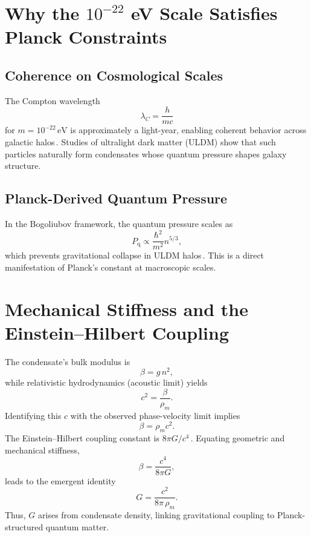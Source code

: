 \documentclass[aps,prd,twocolumn,amsmath,amssymb,longbibliography,nofootinbib]{revtex4-2}
\begin{document}
\section{Why the \texorpdfstring{$10^{-22}$}{1e-22} eV Scale Satisfies Planck Constraints}
\subsection{Coherence on Cosmological Scales}
The Compton wavelength
\begin{equation}
  \lambda_C = \frac{h}{m c}
\end{equation}
for \(m = 10^{-22}\,\mathrm{eV}\) is approximately a light-year, enabling coherent behavior across galactic halos\,\cite{Hui2017ULDM,Marsh2016axion}. Studies of ultralight dark matter (ULDM) show that such particles naturally form condensates whose quantum pressure shapes galaxy structure.

\subsection{Planck-Derived Quantum Pressure}
In the Bogoliubov framework, the quantum pressure scales as
\begin{equation}
  P_{\mathrm q} \propto \frac{\hbar^{2}}{m^{2}} n^{5/3},
\end{equation}
which prevents gravitational collapse in ULDM halos\,\cite{Hui2017ULDM,Marsh2016axion}. This is a direct manifestation of Planck's constant at macroscopic scales.

\section{Mechanical Stiffness and the Einstein--Hilbert Coupling}
The condensate's bulk modulus is
\begin{equation}
  \beta = g\, n^{2},
\end{equation}
while relativistic hydrodynamics (acoustic limit) yields
\begin{equation}
  c^{2} = \frac{\beta}{\rho_{m}}.
\end{equation}
Identifying this \(c\) with the observed phase-velocity limit implies
\begin{equation}
  \beta = \rho_{m} c^{2}.
\end{equation}
The Einstein--Hilbert coupling constant is \(8\pi G / c^{4}\)\,\cite{Einstein1915,EinsteinRelativity1922}. Equating geometric and mechanical stiffness,
\begin{equation}
  \beta = \frac{c^{4}}{8\pi G},
\end{equation}
leads to the emergent identity
\begin{equation}
  G = \frac{c^{2}}{8\pi\, \rho_{m}}.
\end{equation}
Thus, \(G\) arises from condensate density, linking gravitational coupling to Planck-structured quantum matter.
\end{document}
